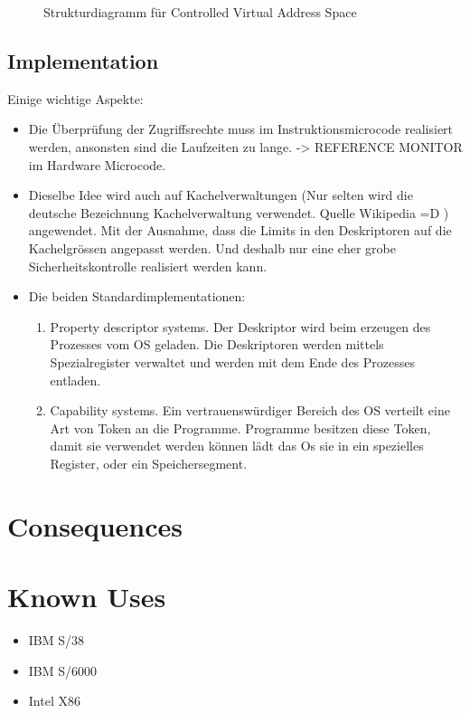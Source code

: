 \begin{figure}[H]
  \centering
  
  \caption{Strukturdiagramm f\"ur Controlled Virtual Address Space}
\end{figure}

\subsection{Implementation}
Einige wichtige Aspekte:
\begin{itemize}
  \item Die Überprüfung der Zugriffsrechte muss im Instruktionsmicrocode realisiert werden, ansonsten sind die Laufzeiten zu lange. -> REFERENCE MONITOR im Hardware Microcode.
  \item Dieselbe Idee wird auch auf Kachelverwaltungen (Nur selten wird die deutsche Bezeichnung Kachelverwaltung verwendet. Quelle Wikipedia =D ) angewendet. Mit der Ausnahme, dass die Limits in den Deskriptoren auf die Kachelgrössen angepasst werden. Und deshalb nur eine eher grobe Sicherheitskontrolle realisiert werden kann.
  \item Die beiden Standardimplementationen:
    \begin{enumerate}
      \item Property descriptor systems. Der Deskriptor wird beim erzeugen des Prozesses vom OS geladen. Die Deskriptoren werden mittels Spezialregister verwaltet und werden mit dem Ende des Prozesses entladen.
      \item Capability systems. Ein vertrauenswürdiger Bereich des OS verteilt eine Art von Token an die Programme. Programme besitzen diese Token, damit sie verwendet werden können lädt das Os sie in ein spezielles Register, oder ein Speichersegment.
    \end{enumerate}
\end{itemize}

\section{Consequences}
\begin{itemize}
\end{itemize}

\section{Known Uses}
\begin{itemize}
  \item IBM S/38
  \item IBM S/6000
  \item Intel X86
\end{itemize}

